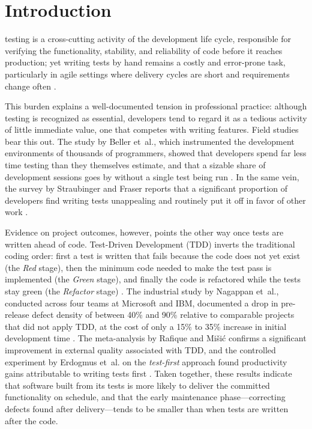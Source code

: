 \documentclass[10pt,journal,twoside,letterpaper]{IEEEtran}
\begin{document}
    \section{Introduction}
    \label{sec:introduccion}
    
     testing is a cross-cutting activity of the development life cycle, responsible for verifying the functionality, stability, and reliability of code before it reaches production; yet writing tests by hand remains a costly and error-prone task, particularly in agile settings where delivery cycles are short and requirements change often \cite{lukasczyk2023empirical,wang2024survey}.
    
    This burden explains a well-documented tension in professional practice: although testing is recognized as essential, developers tend to regard it as a tedious activity of little immediate value, one that competes with writing features. Field studies bear this out. The study by Beller et~al., which instrumented the development environments of thousands of programmers, showed that developers spend far less time testing than they themselves estimate, and that a sizable share of development sessions goes by without a single test being run \cite{beller2015test}. In the same vein, the survey by Straubinger and Fraser reports that a significant proportion of developers find writing tests unappealing and routinely put it off in favor of other work \cite{straubinger2023survey}.
    
    Evidence on project outcomes, however, points the other way once tests are written ahead of code. Test-Driven Development (TDD) inverts the traditional coding order: first a test is written that fails because the code does not yet exist (the \emph{Red} stage), then the minimum code needed to make the test pass is implemented (the \emph{Green} stage), and finally the code is refactored while the tests stay green (the \emph{Refactor} stage) \cite{beck2003tdd}. The industrial study by Nagappan et~al., conducted across four teams at Microsoft and IBM, documented a drop in pre-release defect density of between 40\% and 90\% relative to comparable projects that did not apply TDD, at the cost of only a 15\% to 35\% increase in initial development time \cite{nagappan2008tdd}. The meta-analysis by Rafique and Mišić confirms a significant improvement in external quality associated with TDD, and the controlled experiment by Erdogmus et~al. on the \emph{test-first} approach found productivity gains attributable to writing tests first \cite{rafique2013meta,erdogmus2005testfirst}. Taken together, these results indicate that software built from its tests is more likely to deliver the committed functionality on schedule, and that the early maintenance phase---correcting defects found after delivery---tends to be smaller than when tests are written after the code.
    
\end{document}
